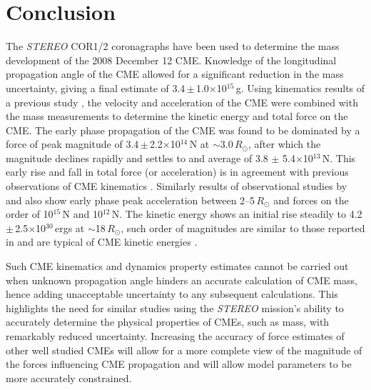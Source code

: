  \section{Conclusion} \label{bozomath}
 The \emph{STEREO} COR1/2 coronagraphs have been used to determine the mass development of the 2008 December 12 CME. Knowledge of the longitudinal propagation angle of the CME allowed for a significant reduction in the mass uncertainty, giving a final estimate of 3.4\,$\pm$\,1.0$\times$10$^{15}$\,g. Using kinematics results of a previous study \citep{byrne2010}, the velocity and acceleration of the CME were combined with the mass measurements to determine the kinetic energy and total force on the CME. The early phase propagation of the CME was found to be dominated by a force of peak magnitude of 3.4\,$\pm$\,2.2$\times$10$^{14}$\,N at $\sim$3.0\,$R_{\odot}$, after which the magnitude declines 
rapidly and settles to and average of 3.8 $\pm$ 5.4$\times$10$^{13}$\,N. This early rise and fall in total force (or acceleration) is in agreement with previous observations of CME kinematics \citep{gallagher03, bein2011}. Similarly results of observational studies by \citet{zhang2001} and \citet{zhang2004} also show early phase peak acceleration between 2--5\,$R_{\odot}$ and forces on the order of 10$^{15}$\,N and 10$^{12}$\,N. The kinetic energy shows an initial rise steadily to 4.2\,$\pm$\,2.5$\times$10$^{30}$\,ergs at $\sim$18\,$R_{\odot}$, such order of magnitudes are similar to those reported in \citet{vou00,emslie2004} and are typical of CME kinetic energies \citep{vour2010}.

Such CME kinematics and dynamics property estimates cannot be carried out when unknown propagation angle hinders an accurate calculation of CME mass, hence adding unacceptable uncertainty to any subsequent calculations. This highlights the need for similar studies using the \emph{STEREO} mission's ability to accurately determine the physical properties of CMEs, such as mass, with remarkably reduced uncertainty. Increasing the accuracy of force estimates of other well studied CMEs will allow for a more complete view of the magnitude of the forces influencing CME propagation and will allow model parameters to be more accurately constrained.




